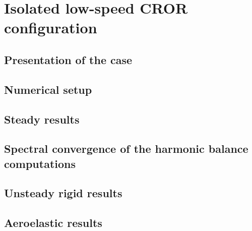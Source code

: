 \chapter{Isolated low-speed CROR configuration}
\label{cha:dream_ls_isolated}

\chabstract{}


\newpage

\section{Presentation of the case}
\label{sec:dream_presentation}


\section{Numerical setup}
\label{sec:dream_ls_numerical}


\section{Steady results}
\label{sec:dream_ls_steady_results}


\section{Spectral convergence of the harmonic balance computations}
\label{sec:dream_ls_spectral_convergence}


\section{Unsteady rigid results}
\label{sec:dream_ls_rigid_results}


\section{Aeroelastic results}
\label{sec:dream_ls_ael_results}


\chconclu{}
